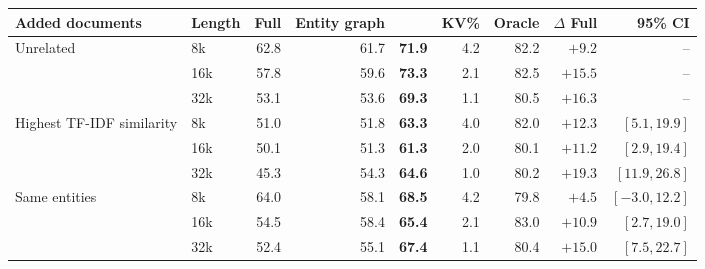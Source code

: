\begin{tabular}{@{}llrrrrrrr@{}}
\toprule
Added documents & Length & Full & Entity graph & \proofkv{} & KV\% & Oracle & $\Delta$ Full & 95\% CI \\
\midrule
Unrelated & 8k & 62.8 & 61.7 & \textbf{71.9} & 4.2 & 82.2 & $+9.2$ & -- \\
 & 16k & 57.8 & 59.6 & \textbf{73.3} & 2.1 & 82.5 & $+15.5$ & -- \\
 & 32k & 53.1 & 53.6 & \textbf{69.3} & 1.1 & 80.5 & $+16.3$ & -- \\
\addlinespace[2pt]
Highest TF-IDF similarity & 8k & 51.0 & 51.8 & \textbf{63.3} & 4.0 & 82.0 & $+12.3$ & $[5.1,19.9]$ \\
 & 16k & 50.1 & 51.3 & \textbf{61.3} & 2.0 & 80.1 & $+11.2$ & $[2.9,19.4]$ \\
 & 32k & 45.3 & 54.3 & \textbf{64.6} & 1.0 & 80.2 & $+19.3$ & $[11.9,26.8]$ \\
\addlinespace[2pt]
Same entities & 8k & 64.0 & 58.1 & \textbf{68.5} & 4.2 & 79.8 & $+4.5$ & $[-3.0,12.2]$ \\
 & 16k & 54.5 & 58.4 & \textbf{65.4} & 2.1 & 83.0 & $+10.9$ & $[2.7,19.0]$ \\
 & 32k & 52.4 & 55.1 & \textbf{67.4} & 1.1 & 80.4 & $+15.0$ & $[7.5,22.7]$ \\
\bottomrule
\end{tabular}
